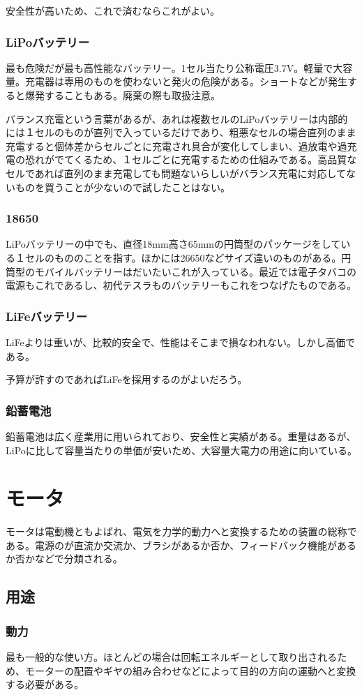 \documentclass[a4paper,titlepage]{ujarticle}
\begin{document}
安全性が高いため、これで済むならこれがよい。
\subsubsection{LiPoバッテリー}
最も危険だが最も高性能なバッテリー。1セル当たり公称電圧3.7V。軽量で大容量。充電器は専用のものを使わないと発火の危険がある。ショートなどが発生すると爆発することもある。廃棄の際も取扱注意。

バランス充電という言葉があるが、あれは複数セルのLiPoバッテリーは内部的には１セルのものが直列で入っているだけであり、粗悪なセルの場合直列のまま充電すると個体差からセルごとに充電され具合が変化してしまい、過放電や過充電の恐れがでてくるため、１セルごとに充電するための仕組みである。高品質なセルであれば直列のまま充電しても問題ないらしいがバランス充電に対応してないものを買うことが少ないので試したことはない。
\subsubsection{18650}
LiPoバッテリーの中でも、直径18mm高さ65mmの円筒型のパッケージをしている１セルのもののことを指す。ほかには26650などサイズ違いのものがある。円筒型のモバイルバッテリーはだいたいこれが入っている。最近では電子タバコの電源もこれであるし、初代テスラものバッテリーもこれをつなげたものである。
\subsubsection{LiFeバッテリー}
LiFeよりは重いが、比較的安全で、性能はそこまで損なわれない。しかし高価である。

予算が許すのであればLiFeを採用するのがよいだろう。
\subsubsection{鉛蓄電池}
鉛蓄電池は広く産業用に用いられており、安全性と実績がある。重量はあるが、LiPoに比して容量当たりの単価が安いため、大容量大電力の用途に向いている。
\section{モータ}
モータは電動機ともよばれ、電気を力学的動力へと変換するための装置の総称である。電源のが直流か交流か、ブラシがあるか否か、フィードバック機能があるか否かなどで分類される。
\subsection{用途}
\subsubsection{動力}
最も一般的な使い方。ほとんどの場合は回転エネルギーとして取り出されるため、モーターの配置やギヤの組み合わせなどによって目的の方向の運動へと変換する必要がある。
\end{document}
